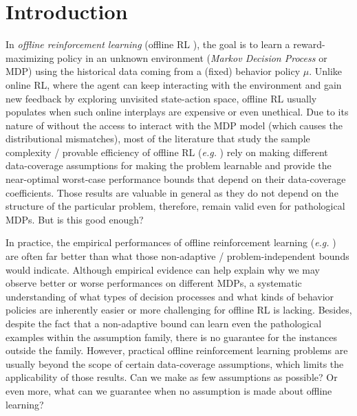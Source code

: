 
\section{Introduction}\label{sec:introduction}

In \emph{offline reinforcement learning} (offline RL \cite{levine2020offline,lange2012batch}), the goal is to learn a reward-maximizing policy in an unknown environment (\emph{Markov Decision Process} or MDP) using the historical data coming from a (fixed) behavior policy $\mu$. Unlike online RL, where the agent can keep interacting with the environment and gain new feedback by exploring unvisited state-action space, offline RL usually populates when such online interplays are expensive or even unethical. Due to its nature of without the access to interact with the MDP model (which causes the distributional mismatches), most of the literature that study the sample complexity / provable efficiency of offline RL (\emph{e.g.} \cite{le2019batch,chen2019information,xie2020q,xie2020batch,yin2021near,yin2021nearoptimal,ren2021nearly,rashidinejad2021bridging,xie2021policy}) rely on making different data-coverage assumptions for making the problem learnable and provide the near-optimal worst-case performance bounds that depend on their data-coverage coefficients. Those results are valuable in general as they do not depend on the structure of the particular problem, therefore, remain valid even for pathological MDPs. But is this good enough?

In practice, the empirical performances of offline reinforcement learning (\emph{e.g.} \cite{gulcehre2020rl,fu2020d4rl,fu2021benchmarks,janner2021reinforcement}) are often far better than what those non-adaptive / problem-independent bounds would indicate. Although empirical evidence can help explain why we may observe better or worse performances on different MDPs, a systematic understanding of what types of decision processes and what kinds of behavior policies are inherently easier or more challenging for offline RL is lacking. Besides, despite the fact that a non-adaptive bound can learn even the pathological examples within the assumption family, there is no guarantee for the instances outside the family. However, practical offline reinforcement learning problems are usually beyond the scope of certain data-coverage assumptions, which limits the applicability of those results. Can we make as few assumptions as possible? Or even more, what can we guarantee when no assumption is made about offline learning? 


